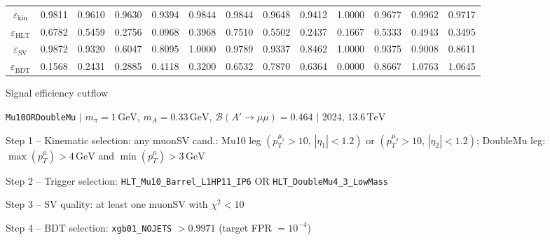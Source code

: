 \documentclass[10pt,a4paper]{article}
\begin{document}
\begin{landscape}
{\begin{tabular}{c|cccc|cccc|cccc}
\midrule
$\varepsilon_{\mathrm{kin}}$ & 0.9811 & 0.9610 & 0.9630 & 0.9394 & 0.9844 & 0.9844 & 0.9648 & 0.9412 & 1.0000 & 0.9677 & 0.9962 & 0.9717\\
$\varepsilon_{\mathrm{HLT}}$ & 0.6782 & 0.5459 & 0.2756 & 0.0968 & 0.3968 & 0.7510 & 0.5502 & 0.2437 & 0.1667 & 0.5333 & 0.4943 & 0.3495\\
$\varepsilon_{\mathrm{SV}}$ & 0.9872 & 0.9320 & 0.6047 & 0.8095 & 1.0000 & 0.9789 & 0.9337 & 0.8462 & 1.0000 & 0.9375 & 0.9008 & 0.8611\\
$\varepsilon_{\mathrm{BDT}}$ & 0.1568 & 0.2431 & 0.2885 & 0.4118 & 0.3200 & 0.6532 & 0.7870 & 0.6364 & 0.0000 & 0.8667 & 1.0763 & 1.0645\\
\bottomrule
\end{tabular}}

\end{landscape}
\clearpage

{\large Signal efficiency cutflow

 \texttt{Mu10ORDoubleMu} $|$ $m_{\pi}=1\,\mathrm{GeV}$, $m_{A}=0.33\,\mathrm{GeV}$, $\mathcal{B}(A'\!\to\!\mu\mu)=0.464$ $|$ 2024, $13.6\,\mathrm{TeV}$}

\vspace{0.8em}

Step 1 -- Kinematic selection: any muonSV cand.: Mu10 leg $(p_T^{\mu_1}{>}10,\,|\eta_1|{<}1.2)$ or $(p_T^{\mu_2}{>}10,\,|\eta_2|{<}1.2)$; DoubleMu leg: $\max(p_T^{\mu}){>}4\,\mathrm{GeV}$ and $\min(p_T^{\mu}){>}3\,\mathrm{GeV}$

Step 2 -- Trigger selection: \texttt{HLT\_Mu10\_Barrel\_L1HP11\_IP6} OR \texttt{HLT\_DoubleMu4\_3\_LowMass}

Step 3 -- SV quality: at least one muonSV with $\chi^2<10$

Step 4 -- BDT selection: \texttt{xgb01\_NOJETS} $>0.9971$ (target FPR $=10^{-4}$)

\vspace{0.8em}
\end{document}
